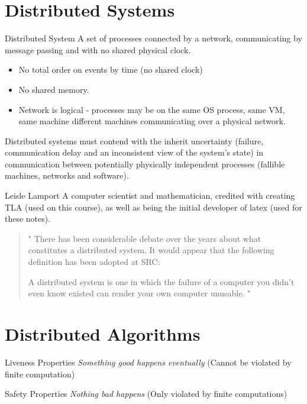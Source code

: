 \section{Distributed Systems}
\begin{definitionbox}{Distributed System}
    A set of processes connected by a network, communicating by message passing and with no shared physical clock.
    \begin{itemize}
        \item No total order on events by time (no shared clock)
        \item No shared memory.
        \item Network is logical - processes may be on the same OS process, same VM, same machine different machines communicating over a physical network. 
    \end{itemize}
\end{definitionbox}

Distributed systems must contend with the inherit uncertainty (failure, communication delay and an inconsistent view of the system's state) in communication between potentially physically independent processes (fallible machines, networks and software).

\begin{sidenotebox}{Leisle Lamport}
    A computer scientist and mathematician, credited with creating TLA (used on this course), as well as being the initial developer of latex (used for these notes).
    \begin{quote}
        "
            There has been considerable debate over the years 
            about what constitutes a distributed system. It 
            would appear that the following definition has been 
            adopted at SRC:

            A distributed system is one in which the failure of 
            a computer you didn't even know existed can render 
            your own computer unusable.
        "
    \end{quote}
\end{sidenotebox}

\section{Distributed Algorithms}
\begin{tcbraster}[raster columns=2, raster equal height]
    \begin{definitionbox}{Liveness Properties}
        \textit{Something good happens eventually} (Cannot be violated by finite computation)
    \end{definitionbox}
    \begin{definitionbox}{Safety Properties}
        \textit{Nothing bad happens} (Only violated by finite computations)
    \end{definitionbox}
\end{tcbraster}

